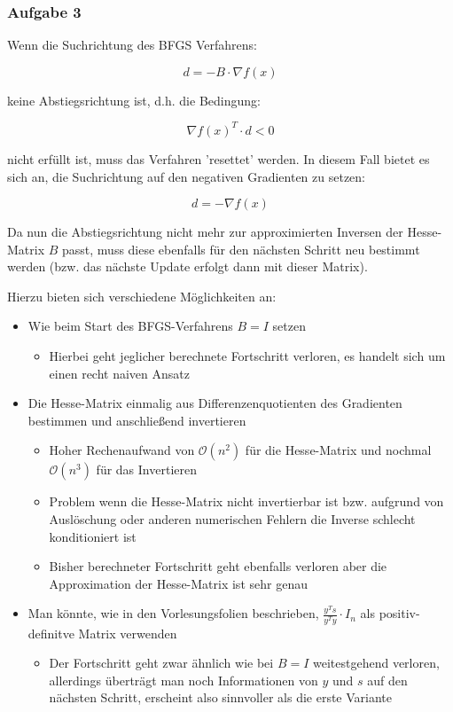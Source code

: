 \documentclass[a4paper, 12pt]{report}
\begin{document}
\newpage

\subsubsection{Aufgabe 3}
Wenn die Suchrichtung des BFGS Verfahrens:

$$d = -B\cdot \nabla f(x) $$

keine Abstiegsrichtung ist, d.h. die Bedingung:

$$\nabla f(x)^T \cdot d < 0 $$

nicht erfüllt ist, muss das Verfahren 'resettet' werden. In diesem Fall bietet es sich an, die Suchrichtung auf den
negativen Gradienten zu setzen:

$$d = -\nabla f(x)$$

Da nun die Abstiegsrichtung nicht mehr zur approximierten Inversen der Hesse-Matrix $B$ passt, muss diese ebenfalls für
den nächsten Schritt neu bestimmt werden (bzw. das nächste Update erfolgt dann mit dieser Matrix).\par
Hierzu bieten sich verschiedene Möglichkeiten an:

\begin{itemize}
  \item Wie beim Start des BFGS-Verfahrens $B = I$ setzen
  \begin{itemize}
    \item Hierbei geht jeglicher berechnete Fortschritt verloren, es handelt sich um einen recht naiven Ansatz
  \end{itemize}
  \item Die Hesse-Matrix einmalig aus Differenzenquotienten des Gradienten bestimmen und anschließend invertieren
  \begin{itemize}
    \item Hoher Rechenaufwand von $\mathcal{O}(n^2)$ für die Hesse-Matrix und nochmal $\mathcal{O}(n^3)$ für das Invertieren
    \item Problem wenn die Hesse-Matrix nicht invertierbar ist bzw. aufgrund von Auslöschung oder anderen numerischen Fehlern
    die Inverse schlecht konditioniert ist
    \item Bisher berechneter Fortschritt geht ebenfalls verloren aber die Approximation der Hesse-Matrix ist sehr genau
  \end{itemize}
  \item Man könnte, wie in den Vorlesungsfolien beschrieben,  $\frac{y^Ts}{y^Ty}\cdot I_n$ als positiv-definitve Matrix verwenden
  \begin{itemize}
    \item Der Fortschritt geht zwar ähnlich wie bei $B = I$ weitestgehend verloren, allerdings überträgt man noch Informationen
    von $y$ und $s$ auf den nächsten Schritt, erscheint also sinnvoller als die erste Variante
  \end{itemize}
\end{itemize}
\end{document}

